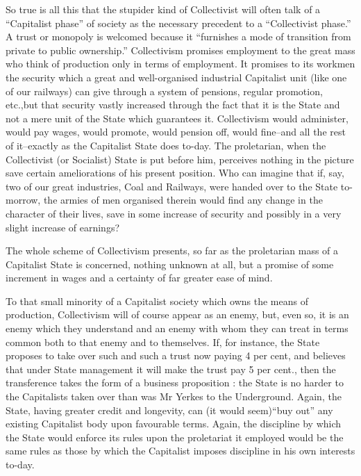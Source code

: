\documentclass{book}
\begin{document}
So true is all this that the stupider kind of Collectivist will often talk of a “Capitalist phase” of society as the necessary precedent to a “Collectivist phase.” A trust or monopoly is welcomed because it “furnishes a mode of transition from private to public ownership.” Collectivism promises employment to the great mass who think of production only in terms of employment. It promises to its workmen the security which a great and well-organised industrial Capitalist unit (like one of our railways) can give through a system of pensions, regular promotion, etc.,but that security vastly increased through the fact that it is the State and not a mere unit of the State which guarantees it. Collectivism would administer, would pay wages, would promote, would pension off, would fine–and all the rest of it–exactly as the Capitalist State does to-day. The proletarian, when the Collectivist (or Socialist) State is put before him, perceives nothing in the picture save certain ameliorations of his present position. Who can imagine that if, say, two of our great industries, Coal and Railways, were handed over to the State to-morrow, the armies of men organised therein would find any change in the character of their lives, save in some increase of security and possibly in a very slight increase of earnings?

The whole scheme of Collectivism presents, so far as the proletarian mass of a Capitalist State is concerned, nothing unknown at all, but a promise of some increment in wages and a certainty of far greater ease of mind.

To that small minority of a Capitalist society which owns the means of production, Collectivism will of course appear as an enemy, but, even so, it is an enemy which they understand and an enemy with whom they can treat in terms common both to that enemy and to themselves. If, for instance, the State proposes to take over such and such a trust now paying 4 per cent, and believes that under State management it will make the trust pay 5 per cent., then the transference takes the form of a business proposition : the State is no harder to the Capitalists taken over than was Mr Yerkes to the Underground. Again, the State, having greater credit and longevity, can (it would seem)\footnotemark[1] “buy out” any existing Capitalist body upon favourable terms. Again, the discipline by which the State would enforce its rules upon the proletariat it employed would be the same rules as those by which the Capitalist imposes discipline in his own interests to-day.
\end{document}
